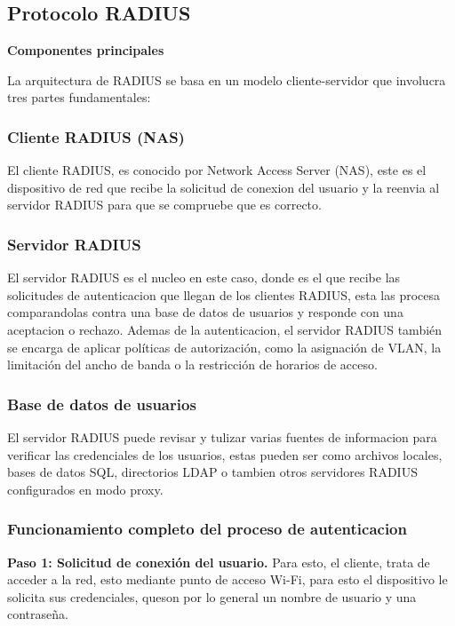 \documentclass[letterpaper,12pt]{article}
\begin{document}
\newpage
\subsection{Protocolo RADIUS}

\textbf{Componentes principales}

La arquitectura de RADIUS se basa en un modelo cliente-servidor que involucra tres partes fundamentales:

\subsubsection{Cliente RADIUS (NAS)}

El cliente RADIUS, es conocido por Network Access Server (NAS), 
este es el dispositivo de red que recibe la solicitud de conexion del usuario y la 
reenvia al servidor RADIUS para que se compruebe que es correcto. 
\subsubsection{Servidor RADIUS}

El servidor RADIUS es el nucleo en este caso, donde es el que recibe las solicitudes de 
autenticacion que llegan de los clientes RADIUS, 
esta las procesa comparandolas contra una base de datos de usuarios 
y responde con una aceptacion o rechazo. 
Ademas de la autenticacion, el servidor 
RADIUS tambi\'en se encarga de aplicar pol\'iticas de autorizaci\'on, como la asignaci\'on de VLAN, la limitaci\'on del ancho de banda o la restricci\'on de horarios de acceso. 

\subsubsection{Base de datos de usuarios}

El servidor RADIUS puede revisar y tulizar 
varias fuentes de informacion para verificar las credenciales de los usuarios, 
estas pueden ser como archivos locales, 
bases de datos SQL, directorios LDAP 
o tambien otros servidores RADIUS configurados en modo proxy. 


\subsubsection{Funcionamiento completo del proceso de autenticacion}


\textbf{Paso 1: Solicitud de conexi\'on del usuario.} Para esto, el cliente, trata de acceder
a la red, esto mediante punto de acceso Wi-Fi, para esto el 
dispositivo le solicita sus credenciales, queson por lo general un nombre de usuario y una contraseña.
\end{document}
